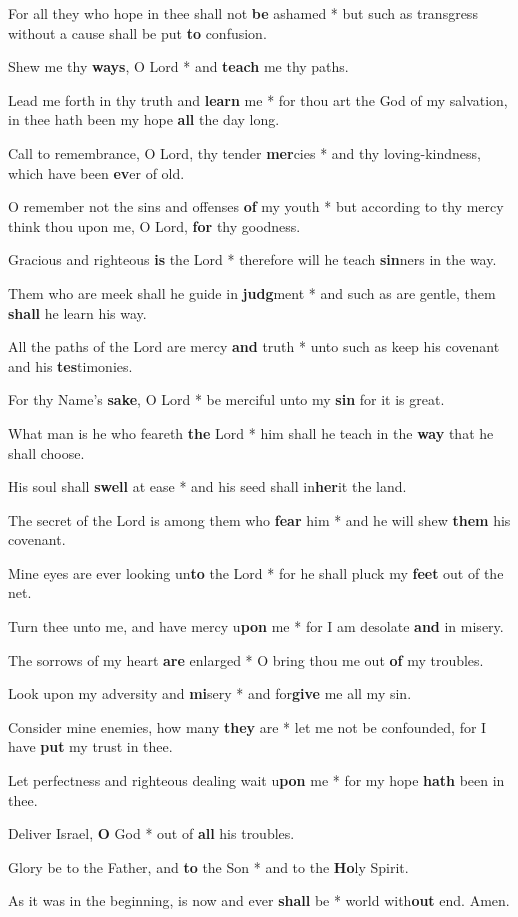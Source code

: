 \begin{multicols}{2}
	For all they who hope in thee shall not \textbf{be} ashamed * but such as transgress without a cause shall be put \textbf{to} confusion.
	
	Shew me thy \textbf{ways}, O Lord * and \textbf{teach} me thy paths.
	
	Lead me forth in thy truth and \textbf{learn} me * for thou art the God of my salvation, in thee hath been my hope \textbf{all} the day long.
	
	Call to remembrance, O Lord, thy tender \textbf{mer}cies * and thy loving-kindness, which have been \textbf{ev}er of old.
	
	O remember not the sins and offenses \textbf{of} my youth * but according to thy mercy think thou upon me, O Lord, \textbf{for} thy goodness.
	
	Gracious and righteous \textbf{is} the Lord * therefore will he teach \textbf{sin}ners in the way.
	
	Them who are meek shall he guide in \textbf{judg}ment * and such as are gentle, them \textbf{shall} he learn his way.
	
	All the paths of the Lord are mercy \textbf{and} truth * unto such as keep his covenant and his \textbf{tes}timonies.
	
	For thy Name's \textbf{sake}, O Lord * be merciful unto my \textbf{sin} for it is great.
	
	What man is he who feareth \textbf{the} Lord * him shall he teach in the \textbf{way} that he shall choose.
	
	His soul shall \textbf{swell} at ease * and his seed shall in\textbf{her}it the land.
	
	The secret of the Lord is among them who \textbf{fear} him * and he will shew \textbf{them} his covenant.
	
	Mine eyes are ever looking un\textbf{to} the Lord * for he shall pluck my \textbf{feet} out of the net.
	
	Turn thee unto me, and have mercy u\textbf{pon} me * for I am desolate \textbf{and} in misery.
	
	The sorrows of my heart \textbf{are} enlarged * O bring thou me out \textbf{of} my troubles.
	
	Look upon my adversity and \textbf{mi}sery * and for\textbf{give} me all my sin.
	
	Consider mine enemies, how many \textbf{they} are * let me not be confounded, for I have \textbf{put} my trust in thee.
	
	Let perfectness and righteous dealing wait u\textbf{pon} me * for my hope \textbf{hath} been in thee.
	
	Deliver Israel, \textbf{O} God * out of \textbf{all} his troubles.
	
	Glory be to the Father, and \textbf{to} the Son * and to the \textbf{Ho}ly Spirit.
	
	As it was in the beginning, is now and ever \textbf{shall} be * world with\textbf{out} end. Amen.
\end{multicols}